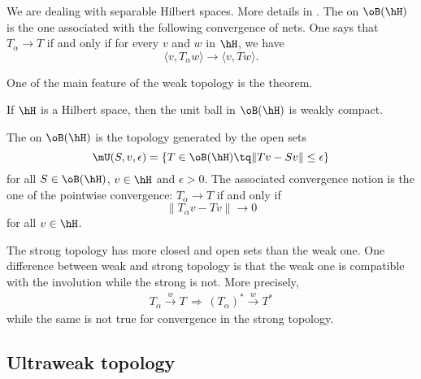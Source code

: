 We are dealing with separable Hilbert spaces. More details in \cite{JonesVN}. The  on $\oB(\hH)$ is the one associated with the following convergence of nets. One says that $T_{\alpha}\to T$ if and only if for every $v$ and $w$ in $\hH$, we have
\begin{equation}
 \langle v, T_{\alpha}w\rangle \to \langle v, Tw\rangle .
\end{equation}

One of the main feature of the weak topology is the  theorem.
\begin{theorem}		\label{ThoBanachAlaoglu}
If $\hH$ is a Hilbert space, then the unit ball in $\oB(\hH)$ is weakly compact.
\end{theorem}


The  on $\oB(\hH)$ is the topology generated by the open sets
\begin{equation}
\mU(S,v,\epsilon)=\{ T\in\oB(\hH)\tq \| Tv-Sv \|\leq\epsilon \}
\end{equation}
for all $S\in\oB(\hH)$, $v\in\hH$ and $\epsilon>0$. The associated convergence notion is the one of the pointwise convergence: $T_{\alpha}\to T$ if and only if 
\begin{equation}		\label{EqDEflimforte}
\| T_{\alpha}v-Tv \|\to 0
\end{equation}
 for all $v\in\hH$.

The strong topology has more closed and open sets than the weak one. One difference between weak and strong topology is that the weak one is compatible with the involution while the strong is not. More precisely, \label{PgStarWeakRespecte}
\begin{align}
	T_{\alpha}\stackrel{w}{\to}T\,\Rightarrow\,(T_{\alpha})^*\stackrel{w}{\to}T^*
\end{align}
while the same is not true for convergence in the strong topology.

					\subsection{Ultraweak topology}		\label{subSecUltraWtopol}



